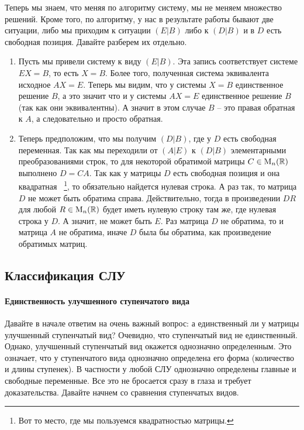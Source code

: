 Теперь мы знаем, что меняя по алгоритму систему, мы не меняем множество решений.
Кроме того, по алгоритму, у нас в результате работы бывают две ситуации, либо мы приходим к ситуации $(E|B)$ либо к $(D|B)$ и в $D$ есть свободная позиция.
Давайте разберем их отдельно.
\begin{enumerate}
\item Пусть мы привели систему к виду $(E|B)$.
Эта запись соответствует системе $E X = B$, то есть $X = B$.
Более того, полученная система эквивалента исходное $AX = E$.
Теперь мы видим, что у системы $X = B$ единственное решение $B$, а это значит что и у системы $AX = E$ единственное решение $B$ (так как они эквивалентны).
А значит в этом случае $B$ -- это правая обратная к $A$, а следовательно и просто обратная.

\item Теперь предположим, что мы получим $(D|B)$, где у $D$ есть свободная переменная.
Так как мы переходили от $(A|E)$ к $(D|B)$ элементарными преобразованиями строк, то для некоторой обратимой матрицы $C\in \operatorname{M}_{n}(\mathbb R)$ выполнено $D = CA$.
Так как у матрицы $D$ есть свободная позиция и она квадратная~%
\footnote{Вот то место, где мы пользуемся квадратностью матрицы.},
то обязательно найдется нулевая строка.
А раз так, то матрица $D$ не может быть обратима справа.
Действительно, тогда в произведении $D R$ для любой $R\in \operatorname{M}_{n}(\mathbb R)$ будет иметь нулевую строку там же, где нулевая строка у $D$.
А значит, не может быть $E$.
Раз матрица $D$ не обратима, то и матрица $A$ не обратима, иначе $D$ была бы обратима, как произведение обратимых матриц.
\end{enumerate}

\subsection{Классификация СЛУ}

\paragraph{Единственность улучшенного ступенчатого вида}

Давайте в начале ответим на очень важный вопрос: а единственный ли у матрицы улучшенный ступенчатый вид?
Очевидно, что ступенчатый вид не единственный.
Однако, улучшенный ступенчатый вид окажется однозначно определенным.
Это означает, что у ступенчатого вида однозначно определена его форма (количество и длины ступенек).
В частности у любой СЛУ однозначно определены главные и свободные переменные.
Все это не бросается сразу в глаза и требует доказательства.
Давайте начнем со сравнения ступенчатых видов.

